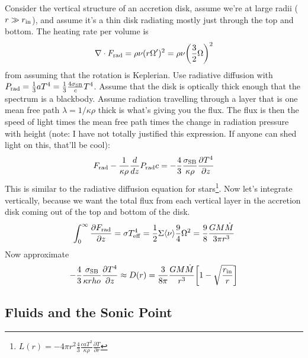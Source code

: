 \begin{enumerate}
      Consider the vertical structure of an accretion disk, assume we're at large radii ($r \gg r_{\rm in}$), and assume it's a thin disk radiating mostly just through the top and bottom. The heating rate per volume is
      \begin{equation}
      \nabla \cdot F_{\rm rad} = \rho \nu (r \Omega^\prime)^2 = \rho \nu \biggl(\frac{3}{2} \Omega \biggr)^2
      \end{equation}
      from assuming that the rotation is Keplerian. Use radiative diffusion with $P_{\rm rad} = \frac{1}{3} a T^4 = \frac{1}{3}\frac{4 \sigma_{\rm SB}}{c}T^4$. Assume that the disk is optically thick enough that the spectrum is a blackbody. Assume radiation travelling through a layer that is one mean free path $\lambda = 1/\kappa \rho$ thick is what's giving you the flux. The flux is then the speed of light times the mean free path times the change in radiation pressure with height (note: I have not totally justified this expression. If anyone can shed light on this, that'll be cool):
      \begin{equation}
      F_{\rm rad} - \frac{1}{\kappa \rho} \frac{d}{dz}P_{\rm rad} c = -\frac{4}{3}\frac{\sigma_{\rm SB}}{\kappa \rho}\frac{\partial T^4}{\partial z}
      \end{equation}
      This is similar to the radiative diffusion equation for stars\footnote{$L(r) = -4 \pi r^2 \frac{4}{3} \frac{c a T^3}{\kappa\rho}\frac{\partial T}{\partial r}$}. Now let's integrate vertically, because we want the total flux from each vertical layer in the accretion disk coming out of the top and bottom of the disk.
      \begin{equation}
      \int^\infty_0 \frac{\partial F_{\rm rad}}{\partial z} = \sigma T_{\rm eff}^4 = \frac{1}{2} \Sigma \langle \nu \rangle \frac{9}{4}\Omega^2 = \frac{9}{8} \frac{G M \dot{M}}{3 \pi r^3}
      \end{equation}
      Now approximate 
      \begin{equation}
      -\frac{4}{3} \frac{\sigma_{\rm SB}}{\kappa rho} \frac{\partial T^4}{\partial z} \approx D(r) = \frac{3}{8 \pi}\frac{GM\dot{M}}{r^3}\biggl[1 - \sqrt{\frac{r_{\rm in}}{r}} \biggr]
      \end{equation}
      
      
\end{enumerate}

\subsection{Fluids and the Sonic Point}

